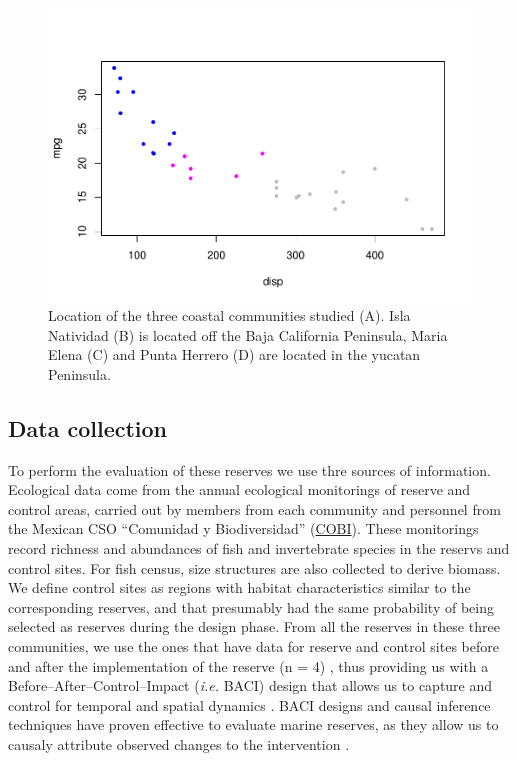 \documentclass{frontiersSCNS}
\theoremstyle{definition}
\theoremstyle{definition}
\theoremstyle{definition}
\theoremstyle{remark}
\begin{document}
\begin{figure}
\centering
\includegraphics{Villasenor-Derbez_files/figure-latex/unnamed-chunk-1-1.pdf}
\caption{\label{fig:unnamed-chunk-1}\label{fig:map}Location of the three
coastal communities studied (A). Isla Natividad (B) is located off the
Baja California Peninsula, Maria Elena (C) and Punta Herrero (D) are
located in the yucatan Peninsula.}
\end{figure}

\subsection{Data collection}\label{data-collection}

To perform the evaluation of these reserves we use thre sources of
information. Ecological data come from the annual ecological monitorings
of reserve and control areas, carried out by members from each community
and personnel from the Mexican CSO ``Comunidad y Biodiversidad''
(\href{www.cobi.org.mx}{COBI}). These monitorings record richness and
abundances of fish and invertebrate species in the reservs and control
sites. For fish census, size structures are also collected to derive
biomass. We define control sites as regions with habitat characteristics
similar to the corresponding reserves, and that presumably had the same
probability of being selected as reserves during the design phase. From
all the reserves in these three communities, we use the ones that have
data for reserve and control sites before and after the implementation
of the reserve (n = 4) , thus providing us with a
Before--After--Control--Impact (\emph{i.e.} BACI) design that allows us
to capture and control for temporal and spatial dynamics
\citep{depalma_2018,ferraro_2006-oW}. BACI designs and causal inference
techniques have proven effective to evaluate marine reserves, as they
allow us to causaly attribute observed changes to the intervention
\citep{moland_2013-VP,Villasenor-Derbez_2018}.
\end{document}
